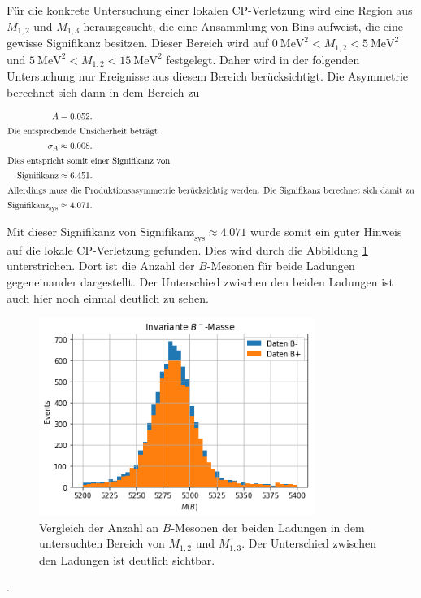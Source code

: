 Für die konkrete Untersuchung einer lokalen CP-Verletzung wird eine Region aus $M_{1,2}$ und $M_{1,3}$ herausgesucht, die eine Ansammlung von Bins aufweist, die eine gewisse Signifikanz besitzen.
Dieser Bereich wird auf $\SI{0}{\mega\electronvolt\squared} < M_{1,2} < \SI{5}{\mega\electronvolt\squared}$ und $\SI{5}{\mega\electronvolt\squared} < M_{1,2} < \SI{15}{\mega\electronvolt\squared}$ festgelegt.
Daher wird in der folgenden Untersuchung nur Ereignisse aus diesem Bereich berücksichtigt.
Die Asymmetrie berechnet sich dann in dem Bereich zu


\begin{align*}
  A &= 0.052. \\%
  \intertext{Die entsprechende Unsicherheit beträgt}
  \sigma_A &\approx 0.008 . \\
  \intertext{Dies entspricht somit einer Signifikanz von}
  \text{Signifikanz} &\approx 6.451 . \\
  \intertext{Allerdings muss die Produktionsasymmetrie berücksichtig werden. Die Signifikanz berechnet sich damit zu}
  \text{Signifikanz}_\text{sys} &\approx 4.071 .
\end{align*}

Mit dieser Signifikanz von $\text{Signifikanz}_\text{sys} \approx 4.071$ wurde somit ein guter Hinweis auf die lokale CP-Verletzung gefunden.
Dies wird durch die Abbildung \ref{fig:vglCP} unterstrichen.
Dort ist die Anzahl der $B$-Mesonen für beide Ladungen gegeneinander dargestellt.
Der Unterschied zwischen den beiden Ladungen ist auch hier noch einmal deutlich zu sehen.

\begin{figure}
  \centering
  \includegraphics[width=0.8\textwidth]{plots/real_data_local_region_inv_mass_B.png}
  \caption{Vergleich der Anzahl an $B$-Mesonen der beiden Ladungen in dem untersuchten Bereich von $M_{1,2}$ und $M_{1,3}$. Der Unterschied zwischen den Ladungen ist deutlich sichtbar.}
  \label{fig:vglCP}
\end{figure}




.
